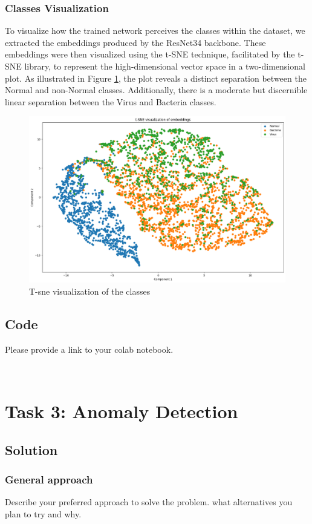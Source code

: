 \documentclass{article}
\begin{document}
\subsubsection{Classes Visualization}
To visualize how the trained network perceives the classes within the dataset, we extracted the embeddings produced by the ResNet34 backbone. These embeddings were then visualized using the t-SNE technique, facilitated by the t-SNE library, to represent the high-dimensional vector space in a two-dimensional plot. As illustrated in Figure \ref{fig:t_sne_1b}, the plot reveals a distinct separation between the Normal and non-Normal classes. Additionally, there is a moderate but discernible linear separation between the Virus and Bacteria classes.

\begin{figure}
  \centering
  \includegraphics[width=0.55\linewidth, angle=0]{t_sne_1b.png}
  \caption{T-sne visualization of the classes}
  \label{fig:t_sne_1b}
\end{figure}

\subsection{Code}

Please provide a link to your colab notebook.


\
\section{Task 3: Anomaly Detection}

\subsection{Solution}
\subsubsection{General approach}
Describe your preferred approach to solve the problem. what alternatives you plan to try and why. 
\end{document}
